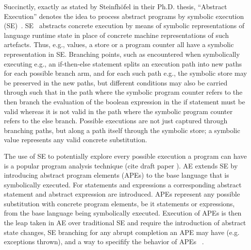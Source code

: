 
Succinctly, exactly as stated by Steinfhöfel in their Ph.D. thesis, ``Abstract Execution'' denotes the idea to process abstract programs by symbolic execution (SE)~\cite{steinhoefel-20}.
SE~\cite{DBLP:journals/csur/BaldoniCDDF18,DBLP:journals/ac/YangFBCW19} abstracts concrete execution by means of symbolic representations of language runtime
state in place of concrete machine representations of such artefacts.
Thus, e.g., values, a store or a program counter all have a symbolic representation in SE.
Branching points, such as encountered when symbolically executing e.g., an if-then-else statement splits an execution path into new paths for each possible branch arm, and for each such
path e.g., the symbolic store may be preserved in the new paths, but different conditions may also be carried through such that in the path where the symbolic program counter refers
to the then branch the evaluation of the boolean expression in the if statement must be valid whereas it is not valid in the path where the symbolic program counter refers to the else branch.
Possible executions are not just captured through branching paths, but along a path itself through the symbolic store; a symbolic value represents any valid concrete substitution.


The use of SE to potentially explore every possible execution a program can have is a popular program analysis technique (cite draft paper \cite{xxx}). AE extends SE by
introducing abstract program elements (APEs) to the base language that is symbolically executed.
For statements and expressions a corresponding abstract statement and abstract expression are introduced.
APEs represent any possible substitution with concrete program elements, be it statements or expressions, from the base language being symbolically executed.
Execution of APEs is then the leap taken in AE over traditional SE and require the introduction of abstract state changes, SE branching for
any abrupt completion an APE may have (e.g. exceptions thrown),  and a way to specifify the behavior of APEs ~\cite{steinhoefel-20}.

